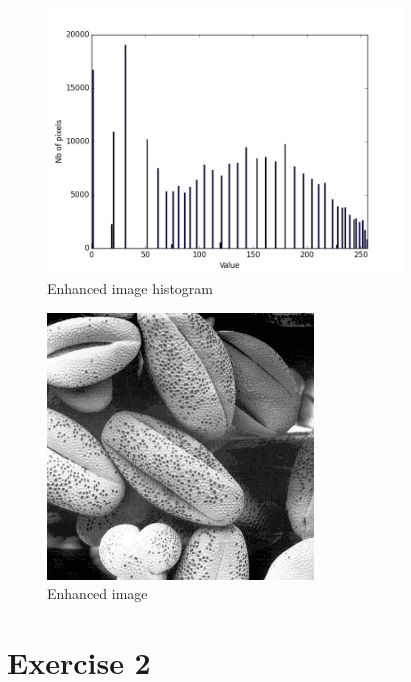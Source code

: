 \documentclass[10pt]{article}
\begin{document}
\begin{figure}[!ht]
	\centering
	\includegraphics[height=200pt]{./ex1/Fig2_enh_hist.png}
	\caption{Enhanced image histogram}
\end{figure}
\begin{figure}[!ht]
	\centering
	\includegraphics[height=200pt]{./ex1/Fig2_enh.jpg}
	\caption{Enhanced image}
\end{figure}
\clearpage

\section{Exercise 2}
\end{document}

